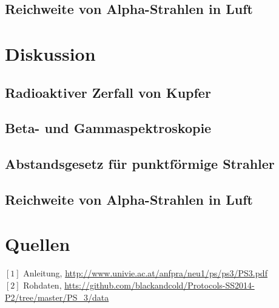 \documentclass[12pt,a4paper]{article}
\begin{document}
\begin{multicols}{2}
\subsection{Reichweite von Alpha-Strahlen in Luft}



\pagebreak
\section{Diskussion}

\subsection{Radioaktiver Zerfall von Kupfer}

\subsection{Beta- und Gammaspektroskopie}

\subsection{Abstandsgesetz für punktförmige Strahler}

\subsection{Reichweite von Alpha-Strahlen in Luft}



\section{Quellen}
$[1]$ Anleitung, \url{http://www.univie.ac.at/anfpra/neu1/ps/ps3/PS3.pdf}\\
$[2]$ Rohdaten, \url{htts://github.com/blackandcold/Protocols-SS2014-P2/tree/master/PS_3/data}\\

\end{multicols}
\end{document}
